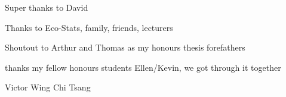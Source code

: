 
{\bigskip}Super thanks to David

{\bigskip\noindent}Thanks to Eco-Stats, family, friends, lecturers

{\bigskip\noindent}Shoutout to Arthur and Thomas as my honours thesis forefathers

{\bigskip\noindent}thanks my fellow honours students Ellen/Kevin, we got through it together

{\bigskip\bigskip\bigskip\noindent}Victor Wing Chi Tsang
